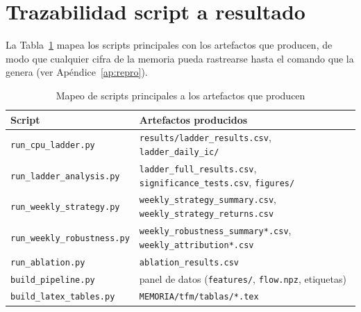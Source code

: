 \section{Trazabilidad script a resultado}

La Tabla~\ref{tab:repo-mapping} mapea los scripts principales con los artefactos
que producen, de modo que cualquier cifra de la memoria pueda rastrearse hasta
el comando que la genera (ver Apéndice~\ref{ap:repro}).

\begin{table}[htbp]
\centering
\caption{Mapeo de scripts principales a los artefactos que producen}
\label{tab:repo-mapping}
\small
\begin{tabular}{l p{8.2cm}}
\toprule
Script & Artefactos producidos \\
\midrule
\texttt{run\_cpu\_ladder.py} & \texttt{results/ladder\_results.csv}, \texttt{ladder\_daily\_ic/} \\
\texttt{run\_ladder\_analysis.py} & \texttt{ladder\_full\_results.csv}, \texttt{significance\_tests.csv}, \texttt{figures/} \\
\texttt{run\_weekly\_strategy.py} & \texttt{weekly\_strategy\_summary.csv}, \texttt{weekly\_strategy\_returns.csv} \\
\texttt{run\_weekly\_robustness.py} & \texttt{weekly\_robustness\_summary*.csv}, \texttt{weekly\_attribution*.csv} \\
\texttt{run\_ablation.py} & \texttt{ablation\_results.csv} \\
\texttt{build\_pipeline.py} & panel de datos (\texttt{features/}, \texttt{flow.npz}, etiquetas) \\
\texttt{build\_latex\_tables.py} & \texttt{MEMORIA/tfm/tablas/*.tex} \\
\bottomrule
\end{tabular}
\end{table}
